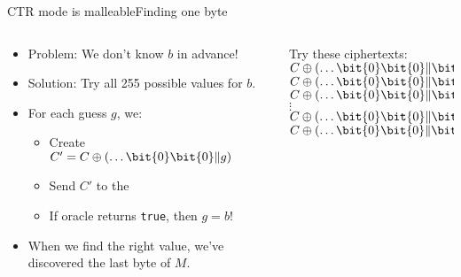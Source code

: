 \documentclass[aspectratio=169, lualatex, handout]{beamer}
\begin{document}
\begin{frame}{CTR mode is malleable}{Finding one byte}
	\begin{columns}[c]
		\begin{column}{0.5\textwidth}
			\begin{itemize}
				\item Problem: We don't know $b$ in advance!
				\item Solution: Try all 255 possible values for $b$.
				\item For each guess $g$, we:
				      \begin{itemize}
					      \item Create $C' = C \oplus (\ldots \bit{0}\bit{0} \| g)$
					      \item Send $C'$ to the 
					      \item If oracle returns \texttt{true}, then $g = b$!
				      \end{itemize}
				\item When we find the right value, we've discovered the last byte of $M$.
			\end{itemize}
		\end{column}
		\begin{column}{0.5\textwidth}
			\begin{center}
				Try these ciphertexts:\\
				$C \oplus (\ldots \bit{0}\bit{0} \| \bit{0}\bit{1})$\\
				$C \oplus (\ldots \bit{0}\bit{0} \| \bit{0}\bit{2})$\\
				$C \oplus (\ldots \bit{0}\bit{0} \| \bit{0}\bit{3})$\\
				$\vdots$\\
				$C \oplus (\ldots \bit{0}\bit{0} \| \bit{f}\bit{e})$\\
				$C \oplus (\ldots \bit{0}\bit{0} \| \bit{f}\bit{f})$
			\end{center}
		\end{column}
	\end{columns}
\end{frame}
\end{document}
